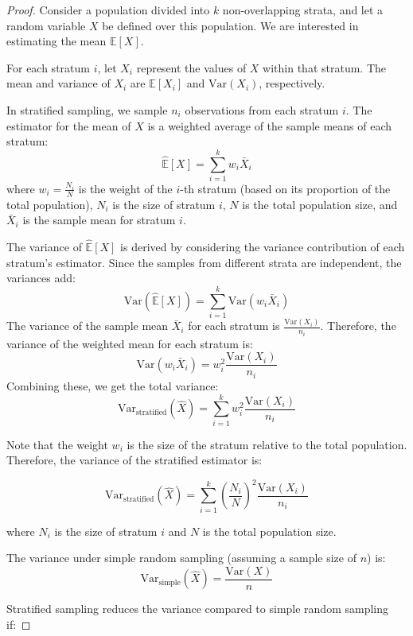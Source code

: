 \documentclass{report}
\begin{document}
\begin{proof}
    Consider a population divided into \( k \) non-overlapping strata, and let a random variable \( X \) be defined over this population. We are interested in estimating the mean \( \mathbb{E}[X] \).

	For each stratum \( i \), let \( X_i \) represent the values of \( X \) within that stratum. The mean and variance of \( X_i \) are \( \mathbb{E}[X_i] \) and \( \mathrm{Var}(X_i) \), respectively.

   	In stratified sampling, we sample \( n_i \) observations from each stratum \( i \). The estimator for the mean of \( X \) is a weighted average of the sample means of each stratum:
   	\[ \hat{\mathbb{E}}[X] = \sum_{i=1}^{k} w_i \bar{X}_i \]
   	where \( w_i = \frac{N_i}{N} \) is the weight of the \( i \)-th stratum (based on its proportion of the total population), \( N_i \) is the size of stratum \( i \), \( N \) is the total population size, and \( \bar{X}_i \) is the sample mean for stratum \( i \).

   	The variance of \( \hat{\mathbb{E}}[X] \) is derived by considering the variance contribution of each stratum's estimator. Since the samples from different strata are independent, the variances add:
   	\[ \mathrm{Var}(\hat{\mathbb{E}}[X]) = \sum_{i=1}^{k} \mathrm{Var}(w_i \bar{X}_i) \]
   	The variance of the sample mean \( \bar{X}_i \) for each stratum is \( \frac{\mathrm{Var}(X_i)}{n_i} \). Therefore, the variance of the weighted mean for each stratum is:
   	\[ \mathrm{Var}(w_i \bar{X}_i) = w_i^2 \frac{\mathrm{Var}(X_i)}{n_i} \]
   	Combining these, we get the total variance:
   	\[ \mathrm{Var}_{\text{stratified}}(\hat{X}) = \sum_{i=1}^{k} w_i^2 \frac{\mathrm{Var}(X_i)}{n_i} \]

	Note that the weight \( w_i \) is the size of the stratum relative to the total population. Therefore, the variance of the stratified estimator is:

	\[ \mathrm{Var}_{\text{stratified}}(\hat{X}) = \sum_{i=1}^{k} \left( \frac{N_i}{N} \right)^2 \frac{\mathrm{Var}(X_i)}{n_i} \]

	where \( N_i \) is the size of stratum \( i \) and \( N \) is the total population size.

   	The variance under simple random sampling (assuming a sample size of \( n \)) is:
   	\[ \mathrm{Var}_{\text{simple}}(\hat{X}) = \frac{\mathrm{Var}(X)}{n} \]

	Stratified sampling reduces the variance compared to simple random sampling if:


\end{proof}
\end{document}

